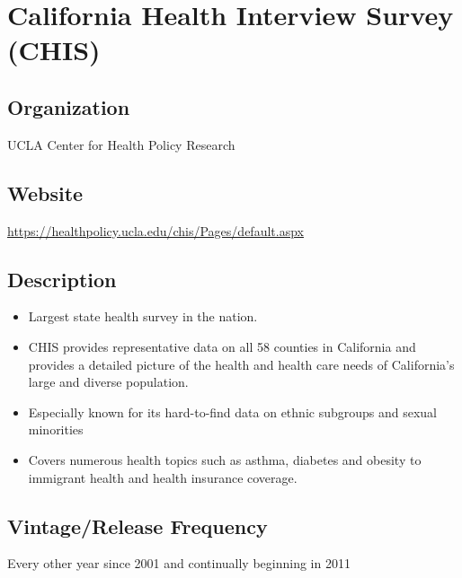 \documentclass[
]{book}
\providecommand{\tightlist}{%
  \setlength{\itemsep}{0pt}\setlength{\parskip}{0pt}}
\begin{document}
\mainmatter

\hypertarget{california-health-interview-survey-chis}{%
\chapter{California Health Interview Survey (CHIS)}\label{california-health-interview-survey-chis}}

\hypertarget{organization-14}{%
\section{Organization}\label{organization-14}}

UCLA Center for Health Policy Research

\hypertarget{website-14}{%
\section{Website}\label{website-14}}

\url{https://healthpolicy.ucla.edu/chis/Pages/default.aspx}

\hypertarget{description-14}{%
\section{Description}\label{description-14}}

\begin{itemize}
\tightlist
\item
  Largest state health survey in the nation.
\item
  CHIS provides representative data on all 58 counties in California and provides a detailed picture of the health and health care needs of California's large and diverse population.
\item
  Especially known for its hard-to-find data on ethnic subgroups and sexual minorities
\item
  Covers numerous health topics such as asthma, diabetes and obesity to immigrant health and health insurance coverage.
\end{itemize}

\hypertarget{vintagerelease-frequency-14}{%
\section{Vintage/Release Frequency}\label{vintagerelease-frequency-14}}

Every other year since 2001 and continually beginning in 2011
\end{document}
